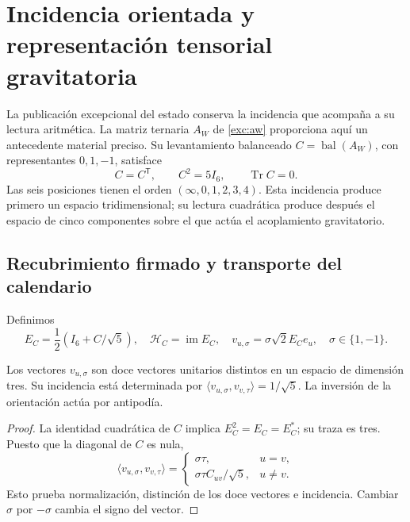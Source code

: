 \section{Incidencia orientada y representación tensorial gravitatoria}
\label{vii:sec:pentacomponente}
La publicación excepcional del estado conserva la incidencia que acompaña
a su lectura aritmética. La matriz ternaria \(A_W\) de
\eqref{exc:aw} proporciona aquí un antecedente material preciso. Su
levantamiento balanceado \(C=\operatorname{bal}(A_W)\), con representantes
\(0,1,-1\), satisface
\[
 C=C^{\mathsf T},\qquad C^2=5I_6,\qquad \operatorname{Tr}C=0.
\]
Las seis posiciones tienen el orden \((\infty,0,1,2,3,4)\).
Esta incidencia produce primero un espacio tridimensional; su lectura
cuadrática produce después el espacio de cinco componentes sobre el que
actúa el acoplamiento gravitatorio.

\subsection{Recubrimiento firmado y transporte del calendario}
Definimos
\[
 E_C=\frac12(I_6+C/\sqrt5),\quad
 \mathcal H_C=\operatorname{im}E_C,\quad
 v_{u,\sigma}=\sigma\sqrt2E_Ce_u,\quad \sigma\in\{1,-1\}.
\]
\begin{proposition}
\label{vii:prop:doce-orientadas}
Los vectores \(v_{u,\sigma}\) son doce vectores unitarios distintos
en un espacio de dimensión tres. Su incidencia está determinada por
\(\langle v_{u,\sigma},v_{v,\tau}\rangle=1/\sqrt5\).
La inversión de la orientación actúa por antipodía.
\end{proposition}
\begin{proof}
La identidad cuadrática de \(C\) implica \(E_C^2=E_C=E_C^*\);
su traza es tres. Puesto que la diagonal de \(C\) es nula,
\[
 \langle v_{u,\sigma},v_{v,\tau}\rangle
 =\begin{cases}\sigma\tau,&u=v,\\
 \sigma\tau C_{uv}/\sqrt5,&u\ne v.
 \end{cases}
\]
Esto prueba normalización, distinción de los doce vectores e incidencia.
Cambiar \(\sigma\) por \(-\sigma\) cambia el signo del vector.
\end{proof}

